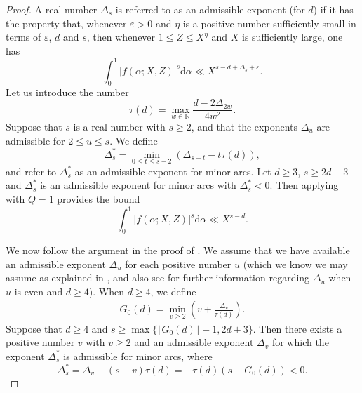\documentclass[reqno, 12pt, reqno]{amsart}
\numberwithin{equation}{section}
\newcommand{\NN}{\mathbb{N}}
\renewcommand{\leq}{\leqslant}
\renewcommand{\geq}{\geqslant}
\renewcommand{\=}{\equiv}
\begin{document}
\begin{proof}
%
A real number $\Delta_s$ is referred to as an admissible exponent (for $d$) if it has the property that, whenever $\varepsilon > 0$ and $\eta$ is a positive number sufficiently small in terms of $\varepsilon$, $d$ and $s$, then whenever $1 \leq Z \leq X^\eta$ and $X$ is sufficiently large, one has
$$
\int_0^1 |f(\alpha; X, Z)|^s \mathrm{d} \alpha \ll X^{s - d + \Delta_s + \varepsilon}.
$$
Let us introduce the number
$$
\tau(d) = \max \limits_{w \in \NN} \frac{d - 2 \Delta_{2w}}{4 w^2}.
$$
Suppose that $s$ is a real number with $s \geq 2$, and that the exponents $\Delta_u$ are admissible for $2 \leq u \leq s$. We define
\[
\Delta_s^* = \min \limits_{0 \leq t \leq s-2}  ( \Delta_{s-t} - t \tau (d) ),
\]
and refer to $\Delta_s^* $ as an admissible exponent for minor arcs.
Let $d \geq 3$, $s \geq 2d + 3$  and $\Delta_s^*$ is an admissible exponent for minor arcs
with $\Delta_s^*  < 0$. Then applying \cite[Theorem 6.1]{BruWoo} with $Q =1$ provides the bound
\[
\int_0^1 |f(\alpha; X, Z)|^s \mathrm{d} \alpha \ll X^{s - d}.
\]

We now follow the argument in the proof of \cite[Theorem 6.2]{BruWoo}.
We assume that we have available an admissible exponent $\Delta_u$ for each positive number $u$  (which we know we may assume as explained in \cite[Section 2]{BruWoo}, and also see \cite[(7.1)]{BruWoo} for further information regarding $\Delta_u$ when $u$ is even and $d \geq 4$).
When $d \geq 4$, we define
\begin{eqnarray}
\label{6.11}
G_0(d)  =  \min_{v \geq 2} \left( v + \frac{\Delta_v}{ \tau(d) } \right).
\end{eqnarray}
Suppose that $d \geq 4$ and $s \geq \max \{ \lfloor G_0 (d) \rfloor + 1, 2d + 3 \}$.
Then there exists a positive number $v$ with $v \geq 2$ and an admissible exponent $\Delta_v$
for which the exponent $\Delta_s^*$ is admissible for minor arcs, where
$$
\Delta^*_s = \Delta_v - (s - v) \tau(d) = - \tau(d) (s - G_0(d)) < 0.
$$


\end{proof}
\end{document}
